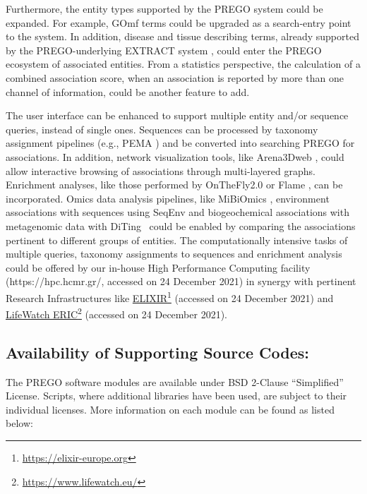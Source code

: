 {   Furthermore, the entity types supported by the PREGO system could be expanded. For example, GOmf terms could be upgraded as a search-entry point to the system. 
   In addition, disease and tissue describing terms, already supported by the PREGO-underlying EXTRACT system \parencite{pafilis2016extract}, could enter the PREGO ecosystem of associated entities. 
   From a statistics perspective, the calculation of a combined association score, when an association is reported by more than one channel of information, could be another feature to add.

   The user interface can be enhanced to support multiple entity and/or sequence queries, instead of single ones. 
   Sequences can be processed by taxonomy assignment pipelines (e.g., PEMA \parencite{zafeiropoulos2020pema}) and be converted into searching PREGO for associations. 
   In addition, network visualization tools, like Arena3Dweb \parencite{karatzas2021arena3dweb}, could allow interactive browsing of associations through multi-layered graphs. 
   Enrichment analyses, like those performed by OnTheFly2.0 \parencite{baltoumas2021onthefly2} or Flame \parencite{thanati2021flame}, 
   can be incorporated. 
   Omics data analysis pipelines, like MiBiOmics \parencite{zoppi2021mibiomics}, environment associations with sequences using SeqEnv \parencite{sinclair2016seqenv} and biogeochemical associations with metagenomic data with DiTing~\parencite{xue_diting_2021} could be enabled by comparing the associations pertinent to different groups of entities. 
   The computationally intensive tasks of multiple queries, taxonomy assignments to sequences and enrichment analysis could be offered by our in-house High Performance Computing facility (https://hpc.hcmr.gr/, accessed on 24 December 2021) \parencite{zafeiropoulos_0s_2021} in synergy with pertinent Research Infrastructures like \href{https://elixir-europe.org}{ELIXIR}\footnote{\href{https://elixir-europe.org}{https://elixir-europe.org}} (accessed on 24 December 2021) and \href{https://www.lifewatch.eu/}{LifeWatch ERIC}\footnote{\href{https://www.lifewatch.eu/}{https://www.lifewatch.eu/}} (accessed on 24 December 2021).



   \subsection*{Availability of Supporting Source Codes:} 
   The PREGO software modules are available under BSD 2-Clause “Simplified” License. Scripts, where additional libraries have been used, are subject to their individual licenses. More information on each module can be found as listed below:
   
}
